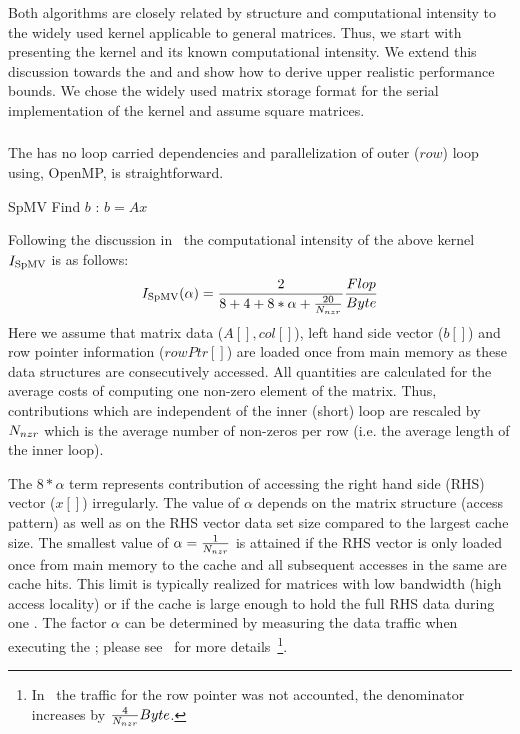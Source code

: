 Both algorithms are closely related by structure and computational intensity to the widely used \SpMV kernel applicable to general matrices. Thus, we start with presenting the \SpMV kernel and its known computational intensity. We extend this discussion towards the \SymmSpmv and \SYMMKACZ and show how to derive upper realistic performance bounds. We chose the widely used \CRS matrix storage format for the serial implementation of the kernel and assume square matrices.

\subsubsection{\SpMV}
The \SpMV has no loop carried dependencies and parallelization of outer ($row$) loop using, \eg OpenMP, is straightforward. 
\begin{algorithm}[H]
	\caption{SpMV Find $b$ : $b=A x$} 
	\label{alg:SpMV}
	\begin{algorithmic}[1]
		\ENDFOR
		\ENDFOR
	\end{algorithmic}
\end{algorithm}
Following the discussion in~\cite{Moritz_sell} the computational intensity of the above kernel $I_\mathrm{SpMV}$  is as follows:
\begin{equation}
\label{eq:SpMV_intensity}
I_\mathrm{\SpMV} (\alpha)= \frac{2}{8+4+8*\alpha+\frac{20}{\NNZRmath}} \frac{Flop}{Byte} \\
\end{equation}
Here we assume that matrix data  ($A[], col[]$), left hand side vector ($b[]$) and row pointer information ($rowPtr[]$) are loaded once from main memory as these data structures are consecutively accessed. All quantities are calculated for the average costs of computing one non-zero element of the matrix. Thus, contributions which are independent of the inner (short) loop are rescaled by $N_{nzr}$ which is the average number of non-zeros per row (i.e. the average length of the inner loop).

The $8*\alpha$ term represents contribution of accessing the right hand side (RHS) vector ($x[]$) irregularly. The value of $\alpha$ depends on the matrix structure (access pattern) as well as on the RHS vector data set size compared to the largest cache size. The smallest value of $\alpha=\frac{1}{N_{nzr}}$ is attained if the RHS vector is only loaded once from main memory to the cache and all subsequent accesses in the same \SpMV are cache hits. This limit is typically realized for matrices with low bandwidth (high access locality) or if the cache is large enough to hold the full RHS data during one \SpMV. The factor $\alpha$ can be determined by measuring the data traffic when executing the \SpMV; please see~\cite{Moritz_sell} for more details~\footnote{In~\cite{Moritz_sell} the traffic for the row pointer was not accounted, \ie the denominator increases by $\frac{4}{N_{nzr}} Byte$.}.

